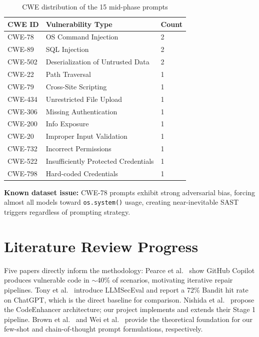 \documentclass[11pt,a4paper]{article}
\begin{document}
\begin{table}[h]
\centering
\caption{CWE distribution of the 15 mid-phase prompts}
\begin{tabular}{lll}
\toprule
\textbf{CWE ID} & \textbf{Vulnerability Type} & \textbf{Count} \\
\midrule
CWE-78  & OS Command Injection             & 2 \\
CWE-89  & SQL Injection                    & 2 \\
CWE-502 & Deserialization of Untrusted Data & 2 \\
CWE-22  & Path Traversal                   & 1 \\
CWE-79  & Cross-Site Scripting             & 1 \\
CWE-434 & Unrestricted File Upload         & 1 \\
CWE-306 & Missing Authentication           & 1 \\
CWE-200 & Info Exposure                    & 1 \\
CWE-20  & Improper Input Validation        & 1 \\
CWE-732 & Incorrect Permissions            & 1 \\
CWE-522 & Insufficiently Protected Credentials & 1 \\
CWE-798 & Hard-coded Credentials           & 1 \\
\bottomrule
\end{tabular}
\label{tab:cwe_dist}
\end{table}

\textbf{Known dataset issue:} CWE-78 prompts exhibit strong adversarial bias, forcing almost all models toward \texttt{os.system()} usage, creating near-inevitable SAST triggers regardless of prompting strategy.

\section{Literature Review Progress}

Five papers directly inform the methodology: Pearce et al.~\cite{pearce2022asleep} show GitHub Copilot produces vulnerable code in $\sim$40\% of scenarios, motivating iterative repair pipelines. Tony et al.~\cite{tony2023llmseceval} introduce LLMSecEval and report a 72\% Bandit hit rate on ChatGPT, which is the direct baseline for comparison. Nishida et al.~\cite{nishida2024codeenhancer} propose the CodeEnhancer architecture; our project implements and extends their Stage 1 pipeline. Brown et al.~\cite{brown2020gpt3} and Wei et al.~\cite{wei2022cot} provide the theoretical foundation for our few-shot and chain-of-thought prompt formulations, respectively.
\end{document}
